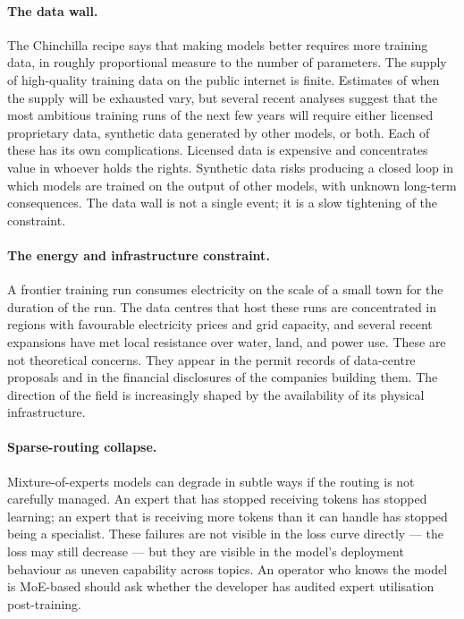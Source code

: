 \paragraph{The data wall.} The Chinchilla recipe says that
making models better requires more training data, in roughly
proportional measure to the number of parameters. The supply
of high-quality training data on the public internet is finite.
Estimates of when the supply will be exhausted vary, but
several recent analyses suggest that the most ambitious
training runs of the next few years will require either
licensed proprietary data, synthetic data generated by other
models, or both. Each of these has its own complications.
Licensed data is expensive and concentrates value in whoever
holds the rights. Synthetic data risks producing a closed loop
in which models are trained on the output of other models, with
unknown long-term consequences. The data wall is not a single
event; it is a slow tightening of the constraint.

\paragraph{The energy and infrastructure constraint.} A
frontier training run consumes electricity on the scale of a
small town for the duration of the run. The data centres that
host these runs are concentrated in regions with favourable
electricity prices and grid capacity, and several recent
expansions have met local resistance over water, land, and
power use. These are not theoretical concerns. They appear in
the permit records of data-centre proposals and in the
financial disclosures of the companies building them. The
direction of the field is increasingly shaped by the
availability of its physical infrastructure.

\paragraph{Sparse-routing collapse.} Mixture-of-experts models
can degrade in subtle ways if the routing is not carefully
managed. An expert that has stopped receiving tokens has
stopped learning; an expert that is receiving more tokens than
it can handle has stopped being a specialist. These failures
are not visible in the loss curve directly --- the loss may
still decrease --- but they are visible in the model's
deployment behaviour as uneven capability across topics. An
operator who knows the model is MoE-based should ask whether
the developer has audited expert utilisation post-training.

